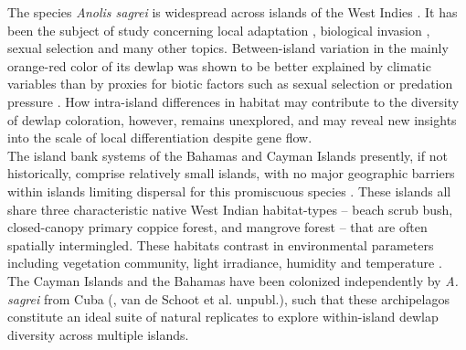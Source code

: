 The species \textit{Anolis sagrei} is widespread across islands of the West Indies \citep{Reynolds2020}. It has been the subject of study concerning local adaptation \citep{Losos1994, Losos1997a, Losos2001, Kolbe2012}, biological invasion \citep{Kolbe2008}, sexual selection \citep{Tokarz2002, Tokarz2005, Tokarz2006, Driessens2014, Steffen2014, Driessens2015} and many other topics. Between-island variation in the mainly orange-red color of its dewlap was shown to be better explained by climatic variables \citep{Driessens2017} than by proxies for biotic factors such as sexual selection or predation pressure \citep{Vanhooydonck2009, Baeckens2018}. How intra-island differences in habitat may contribute to the diversity of dewlap coloration, however, remains unexplored, and may reveal new insights into the scale of local differentiation despite gene flow.\\

The island bank systems of the Bahamas and Cayman Islands presently, if not historically, comprise relatively small islands, with no major geographic barriers within islands limiting dispersal for this promiscuous species \citep{Kamath2018}. These islands all share three characteristic native West Indian habitat-types -- beach scrub bush, closed-canopy primary coppice forest, and mangrove forest -- that are often spatially intermingled. These habitats contrast in environmental parameters including vegetation community, light irradiance, humidity and temperature \citep{Howard1950, Schoener1968}. The Cayman Islands and the Bahamas have been colonized independently by \textit{A. sagrei} from Cuba (\citealt{Reynolds2020}, van de Schoot et al. unpubl.), such that these archipelagos constitute an ideal suite of natural replicates to explore within-island dewlap diversity across multiple islands.\\


